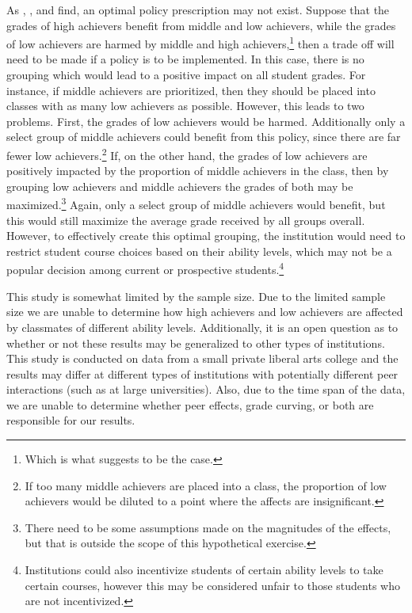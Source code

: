 As \citet{burke2013classroom}, \citet{carman2012classroom}, and \citet{ding2007peers} find, an optimal policy prescription may not exist.
Suppose that the grades of high achievers benefit from middle and low achievers, while the grades of low achievers are harmed by middle and high achievers,\footnote{Which is what  suggests to be the case.} then a trade off will need to be made if a policy is to be implemented. 
In this case, there is no grouping which would lead to a positive impact on all student grades. 
For instance, if middle achievers are prioritized, then they should be placed into classes with as many low achievers as possible. 
However, this leads to two problems.
First, the grades of low achievers would be harmed.
Additionally only a select group of middle achievers could benefit from this policy, since there are far fewer low achievers.\footnote{If too many middle achievers are placed into a class, the proportion of low achievers would be diluted to a point where the affects are insignificant.}
If, on the other hand, the grades of low achievers are positively impacted by the proportion of middle achievers in the class, then by grouping low achievers and middle achievers the grades of both may be maximized.\footnote{There need to be some assumptions made on the magnitudes of the effects, but that is outside the scope of this hypothetical exercise.}
Again, only a select group of middle achievers would benefit, but this would still maximize the average grade received by all groups overall.
However, to effectively create this optimal grouping, the institution would need to restrict student course choices based on their ability levels, which may not be a popular decision among current or prospective students.\footnote{Institutions could also incentivize students of certain ability levels to take certain courses, however this may be considered unfair to those students who are not incentivized.}

This study is somewhat limited by the sample size. 
Due to the limited sample size we are unable to determine how high achievers and low achievers are affected by classmates of different ability levels.
Additionally, it is an open question as to whether or not these results may be generalized to other types of institutions. 
This study is conducted on data from a small private liberal arts college and the results may differ at different types of institutions with potentially different peer interactions (such as at large universities). 
Also, due to the time span of the data, we are unable to determine whether peer effects, grade curving, or both are responsible for our results. 

